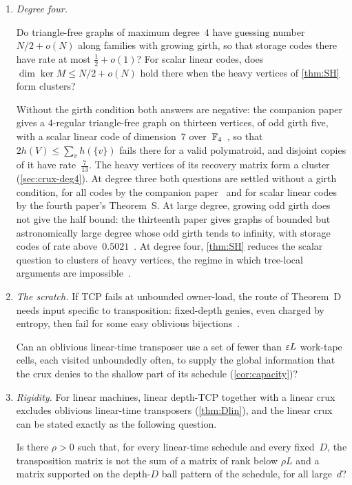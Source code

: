 \begin{enumerate}[label=\arabic*.,leftmargin=2em]
\item \emph{Degree four.}
\begin{problem}\label{prob:deg4}
Do triangle-free graphs of maximum degree~$4$ have guessing number $N/2+o(N)$ along families with growing girth, so that
storage codes there have rate at most $\frac12+o(1)$? For scalar linear codes, does $\dim\ker M\le N/2+o(N)$ hold there when
the heavy vertices of \cref{thm:SH} form clusters?
\end{problem}
Without the girth condition both answers are negative: the companion paper gives a $4$-regular triangle-free graph on thirteen
vertices, of odd girth five, with a scalar linear code of dimension~$7$ over~$\mathbb{F}_4$~\cite[Example~7.8]{SeventhPaper2026}, so
that $2h(V)\le\sum_vh(\{v\})$ fails there for a valid polymatroid, and disjoint copies of it have rate~$\frac7{13}$. The heavy
vertices of its recovery matrix form a cluster (\cref{sec:crux-deg4}). At degree three both questions are settled without a
girth condition, for all codes by the companion paper~\cite{SeventhPaper2026} and for scalar linear codes by the fourth paper's
Theorem~S. At large degree, growing odd girth does not give the half bound: the thirteenth paper gives graphs of bounded but
astronomically large degree whose odd girth tends to infinity, with storage codes of rate above~$0.5021$~\cite[Corollary~U]{StorageCodes2026}.
At degree four, \cref{thm:SH} reduces the scalar question to clusters of heavy vertices, the regime in which
tree-local arguments are impossible~\cite[Proposition~6.28]{FourthPaper2026}.

\item \emph{The scratch.} If TCP fails at unbounded owner-load, the route of Theorem~D needs input specific to transposition:
fixed-depth genies, even charged by entropy, then fail for some easy oblivious bijections~\cite[Theorem~H]{InfoDepthMemo2026}.
\begin{problem}\label{prob:scratch}
Can an oblivious linear-time transposer use a set of fewer than $\varepsilon L$ work-tape cells, each visited unboundedly often, to supply
the global information that the crux denies to the shallow part of its schedule (\cref{cor:capacity})?
\end{problem}

\item \emph{Rigidity.} For linear machines, linear depth-TCP together with a linear crux excludes oblivious linear-time
transposers (\cref{thm:Dlin}), and the linear crux can be stated exactly as the following question.
\begin{problem}\label{prob:rigidity}
Is there $\rho>0$ such that, for every linear-time schedule and every fixed~$D$, the transposition matrix is not the sum of a matrix
of rank below $\rho L$ and a matrix supported on the depth-$D$ ball pattern of the schedule, for all large~$d$?
\end{problem}


\end{enumerate}
